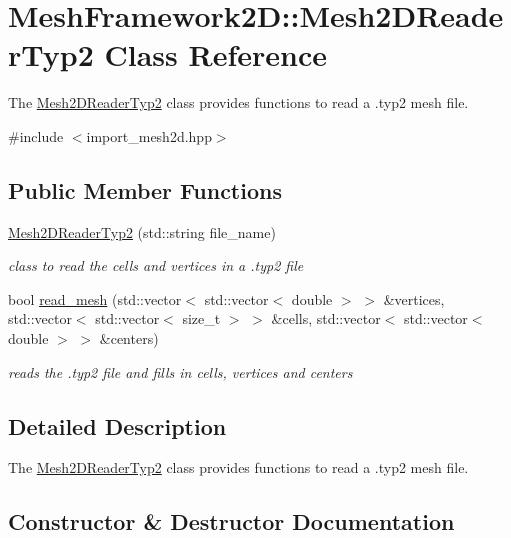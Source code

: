 \hypertarget{classMeshFramework2D_1_1Mesh2DReaderTyp2}{}\section{Mesh\+Framework2D\+:\+:Mesh2\+D\+Reader\+Typ2 Class Reference}
\label{classMeshFramework2D_1_1Mesh2DReaderTyp2}


The \hyperlink{classMeshFramework2D_1_1Mesh2DReaderTyp2}{Mesh2\+D\+Reader\+Typ2} class provides functions to read a .typ2 mesh file.  




{\ttfamily \#include $<$import\+\_\+mesh2d.\+hpp$>$}

\subsection*{Public Member Functions}
\begin{DoxyCompactItemize}
\item 
\hyperlink{classMeshFramework2D_1_1Mesh2DReaderTyp2_a7a45023236b7fb6d1d56a21d16c345f3}{Mesh2\+D\+Reader\+Typ2} (std\+::string file\+\_\+name)
\begin{DoxyCompactList}\small\item\em class to read the cells and vertices in a .typ2 file \end{DoxyCompactList}\item 
bool \hyperlink{classMeshFramework2D_1_1Mesh2DReaderTyp2_a7ae7c26bf4242e528e1a7c6a0f3dce07}{read\+\_\+mesh} (std\+::vector$<$ std\+::vector$<$ double $>$ $>$ \&vertices, std\+::vector$<$ std\+::vector$<$ size\+\_\+t $>$ $>$ \&cells, std\+::vector$<$ std\+::vector$<$ double $>$ $>$ \&centers)
\begin{DoxyCompactList}\small\item\em reads the .typ2 file and fills in cells, vertices and centers \end{DoxyCompactList}\end{DoxyCompactItemize}


\subsection{Detailed Description}
The \hyperlink{classMeshFramework2D_1_1Mesh2DReaderTyp2}{Mesh2\+D\+Reader\+Typ2} class provides functions to read a .typ2 mesh file. 

\subsection{Constructor \& Destructor Documentation}
\mbox{\label{classMeshFramework2D_1_1Mesh2DReaderTyp2_a7a45023236b7fb6d1d56a21d16c345f3}} 
